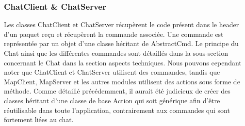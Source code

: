 \subsubsection{ChatClient \& ChatServer}
Les classes ChatClient et ChatServer récupèrent le code présent dans le header d'un paquet reçu et récupèrent la commande associée. Une commande est représentée par un objet d'une classe héritant de AbstractCmd. Le principe du Chat ainsi que les différentes commandes sont détaillés dans la sous-section concernant le Chat dans la section aspects techniques. Nous pouvons cependant noter que ChatClient et ChatServer utilisent des commandes, tandis que MapClient, MapServer et les autres modules utilisent des actions sous forme de méthode. Comme détaillé précédemment, il aurait été judicieux de créer des classes héritant d'une classe de base Action qui soit générique afin d'être réutilisable dans toute l'application, contrairement aux commandes qui sont fortement liées au chat.
